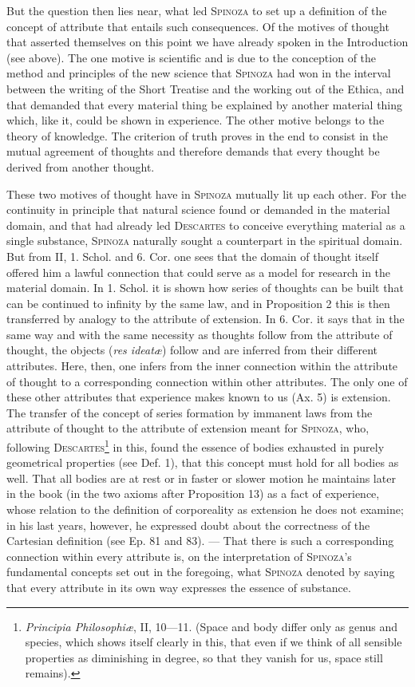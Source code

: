\documentclass[12pt]{article}
\newcommand{\opage}[1]{\marginnote{\footnotesize\textit{[#1]}}}
\begin{document}
But the question then lies near, what led \textsc{Spinoza} to set up a definition of the
concept of attribute that entails such consequences. Of the \opage{39}motives of thought
that asserted themselves on this point we have already spoken in the Introduction (see
above). The one motive is scientific and is due to the conception of the method and
principles of the new science that \textsc{Spinoza} had won in the interval between the
writing of the Short Treatise and the working out of the Ethica, and that demanded that
every material thing be explained by another material thing which, like it, could be shown
in experience. The other motive belongs to the theory of knowledge. The criterion of truth
proves in the end to consist in the mutual agreement of thoughts and therefore demands that
every thought be derived from another thought.

These two motives of thought have in \textsc{Spinoza} mutually lit up each other. For the
continuity in principle that natural science found or demanded in the material domain, and
that had already led \textsc{Descartes} to conceive everything material as a single
substance, \textsc{Spinoza} naturally sought a counterpart in the spiritual domain. But
from II, 1. Schol. and 6. Cor. one sees that the domain of thought itself offered him a
lawful connection that could serve as a model for research in the material domain. In 1.
Schol. it is shown how series of thoughts can be built that can be continued to infinity by
the same law, and in Proposition 2 this is then transferred by analogy to the attribute of
extension. In 6. Cor. it says that in the same way and with the same necessity as thoughts
follow from the attribute of thought, the objects (\textit{res ideatæ}) follow and are
inferred from their different attributes. Here, then, one infers from the inner connection
within the attribute of thought to a corresponding connection within other attributes. The
only one of these other attributes that experience makes known to us (Ax. 5) is extension.
The transfer of the concept of series formation by immanent laws from the attribute of
thought to the attribute of extension meant for \textsc{Spinoza}, who, following
\textsc{Descartes}\footnote{\textit{Principia Philosophiæ}, II, 10---11. (Space and body
differ only as genus and species, which shows itself clearly in this, that even if we think
of all sensible properties as diminishing in degree, so that they vanish for us, space still
remains).} in this, found the essence of bodies exhausted in purely geometrical properties
(see Def. 1), that this concept must hold for all bodies as well. That all bodies are at
rest or in faster or slower motion he maintains later in the book (in the two axioms after
Proposition 13) as a fact of experience, whose relation to the definition of corporeality
as extension he does not examine; in his last years, however, he expressed doubt about the
correctness of the Cartesian definition (see Ep. 81 and 83). --- That there is such a
corresponding connection within every attribute is, on the interpretation of
\textsc{Spinoza}'s fundamental concepts set out in the foregoing, what \textsc{Spinoza}
denoted by saying that every attribute in its own way expresses the essence of substance.
\end{document}
